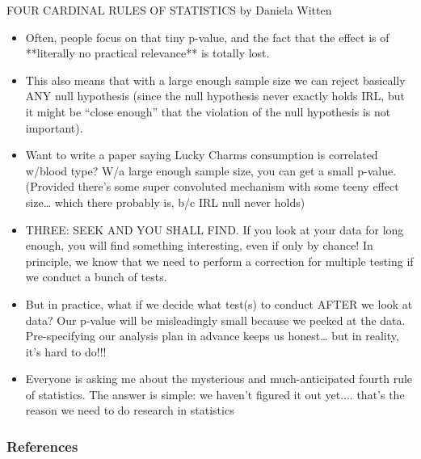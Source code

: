 \documentclass[handout]{beamer}
\begin{document}
\begin{frame}{FOUR CARDINAL RULES OF STATISTICS by Daniela Witten}
\scriptsize{
\begin{itemize}
 \item Often, people focus on that tiny p-value, and the fact that the effect is of **literally no practical relevance** is totally lost.
 \item This also means that with a large enough sample size we can reject basically ANY null hypothesis (since the null hypothesis never exactly holds IRL, but it might be “close enough” that the violation of the null hypothesis is not important). 
 \item Want to write a paper saying Lucky Charms consumption is correlated w/blood type? W/a large enough sample size, you can get a small p-value.  (Provided there’s some super convoluted mechanism with some teeny effect size… which there probably is, b/c IRL null never holds)
\item THREE:  SEEK AND YOU SHALL FIND. If you look at your data for long enough, you will find something interesting, even if only by chance! 
In principle, we know that we need to perform a correction for multiple testing if we conduct a bunch of tests.
\item But in practice, what if we decide what test(s) to conduct AFTER we look at data?  Our p-value will be misleadingly small because we peeked at the data.  Pre-specifying our analysis plan in advance keeps us honest… but in reality, it’s hard to do!!!
\item Everyone is asking me about the mysterious and much-anticipated fourth rule of statistics. The answer is simple: we haven’t figured it out yet.... that’s the reason we need to do research in statistics
\end{itemize}

} 
\end{frame}


\begin{frame}[allowframebreaks]\scriptsize
\frametitle{References}


%
\end{frame}  









\end{document}
